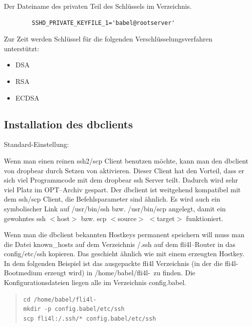 \begin{description}

  Der Dateiname des privaten Teil des Schlüssels im
   Verzeichnis.

\begin{example}
\begin{verbatim}
        SSHD_PRIVATE_KEYFILE_1='babel@rootserver'
\end{verbatim}
\end{example}

  Zur Zeit werden Schlüssel für die folgenden Verschlüsselungsverfahren
  unterstützt:
  \begin{itemize}
  \item DSA
  \item RSA
  \item ECDSA
  \end{itemize}

\end{description}

\subsection {Installation des dbclients}

\begin{description}


  Standard-Einstellung: 

  Wenn man einen reinen ssh2/scp Client benutzen möchte, kann man den
  dbclient von dropbear durch Setzen von 
  aktivieren. Dieser Client hat den Vorteil, dass er sich viel
  Programmcode mit dem dropbear ssh Server teilt. Dadurch wird sehr
  viel Platz im OPT--Archiv gespart. Der dbclient ist weitgehend
  kompatibel mit dem ssh/scp Client, die Befehlsparameter sind ähnlich. Es
  wird auch ein symbolischer Link auf /usr/bin/ssh bzw. /usr/bin/scp angelegt,
  damit ein gewohntes ssh $<$host$>$ bzw. scp $<$source$>$ $<$target$>$ funktioniert.

  Wenn man die dbclient bekannten Hostkeys permanent speichern will muss
  man die Datei known\_hosts auf dem Verzeichnis /.ssh auf dem
  fli4l--Router in das config/etc/ssh kopieren. Das geschieht
  ähnlich wie mit einem erzeugten Hostkey. In dem folgenden Beispiel
  ist das ausgepackte fli4l Verzeichnis (in der die fli4l-Bootmedium
  erzeugt wird) in /home/babel/fli4l-\version~zu finden. Die
  Konfigurationsdateien liegen alle im Verzeichnis config.babel.

\begin{example}
\begin{verse}
\texttt{cd /home/babel/fli4l-\version}\\
\texttt{mkdir -p config.babel/etc/ssh}\\
\texttt{scp fli4l:/.ssh/* config.babel/etc/ssh}
\end{verse}
\end{example}

\end{description}

